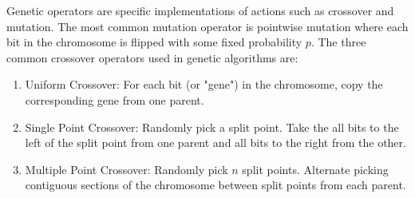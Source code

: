 Genetic operators are specific implementations of actions such as crossover and mutation. The most common mutation operator is pointwise mutation where each bit in the chromosome is flipped with some fixed probability $p$. The three common crossover operators used in genetic algorithms are:
\begin{enumerate}
  \item Uniform Crossover: For each bit (or "gene") in the chromosome, copy the corresponding gene from one parent.
  \item Single Point Crossover: Randomly pick a split point. Take the all bits to the left of the split point from one parent and all bits to the right from the other.
  \item Multiple Point Crossover: Randomly pick $n$ split points. Alternate picking contiguous sections of the chromosome between split points from each parent.
\end{enumerate}


